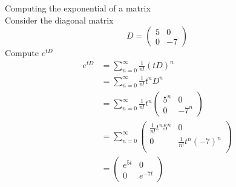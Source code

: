 \documentclass[journal, letterpaper]{IEEEtran}
\begin{document}
    \begin{myboxg}{Computing the exponential of a matrix} \\ 
        Consider the diagonal matrix
        $$ D = \begin{pmatrix}
            5 & 0 \\ 0 & -7
        \end{pmatrix}$$
        Compute $e^{tD}$
        \begin{align*}
            e^{tD} &= \sum_{n = 0}^\infty \frac{1}{n!} (tD)^n \\
            &= \sum_{n = 0}^\infty \frac{1}{n!}t^nD^n \\ 
            &= \sum_{n = 0}^\infty \frac{1}{n!}t^n \begin{pmatrix}
                5^n & 0 \\ 0 & -7^n
            \end{pmatrix} \\ 
            &= \sum_{n=0}^\infty \begin{pmatrix}
               \frac{1}{n!}t^n5^n & 0 \\ 0 & \frac{1}{n!}t^n(-7)^n  \\ 
            \end{pmatrix} \\ 
            &= \begin{pmatrix}
                e^{5t} & 0 \\ 0 & e^{-7t}
            \end{pmatrix}
        \end{align*}
    \end{myboxg}
\end{document}
